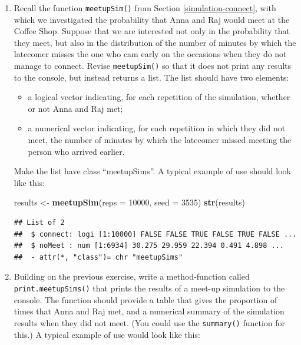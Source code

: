 \documentclass[]{book}
\makeatletter
\newenvironment{Shaded}{\begin{snugshade}}{\end{snugshade}}
\newcommand{\KeywordTok}[1]{\textcolor[rgb]{0.13,0.29,0.53}{\textbf{{#1}}}}
\newcommand{\DataTypeTok}[1]{\textcolor[rgb]{0.13,0.29,0.53}{{#1}}}
\newcommand{\DecValTok}[1]{\textcolor[rgb]{0.00,0.00,0.81}{{#1}}}
\newcommand{\StringTok}[1]{\textcolor[rgb]{0.31,0.60,0.02}{{#1}}}
\newcommand{\NormalTok}[1]{{#1}}
\providecommand{\tightlist}{%
  \setlength{\itemsep}{0pt}\setlength{\parskip}{0pt}}
\newenvironment{kframe}{%
\medskip{}
\setlength{\fboxsep}{.8em}
 \def\at@end@of@kframe{}%
 \ifinner\ifhmode%
  \def\at@end@of@kframe{\end{minipage}}%
  \begin{minipage}{\columnwidth}%
 \fi\fi%
 \def\FrameCommand##1{\hskip\@totalleftmargin \hskip-\fboxsep
 \colorbox{shadecolor}{##1}\hskip-\fboxsep
     \hskip-\linewidth \hskip-\@totalleftmargin \hskip\columnwidth}%
 \MakeFramed {\advance\hsize-\width
   \@totalleftmargin\z@ \linewidth\hsize
   \@setminipage}}%
 {\par\unskip\endMakeFramed%
 \at@end@of@kframe}
\renewenvironment{Shaded}{\begin{kframe}}{\end{kframe}}
\theoremstyle{definition}
\theoremstyle{definition}
\theoremstyle{remark}
\makeatother
\begin{document}
{\begin{enumerate}
  Run a simulation, initializing the ocean with ten whales of each sex.
  Their specific characteristics are up to you, as is the value of the
  starvation parameter. Write an R Markdown document that incorporates
  the appropriate code and includes a discussion of your results.
\item
  Recall the function \texttt{meetupSim()} from Section
  \ref{simulation-connect}, with which we investigated the probability
  that Anna and Raj would meet at the Coffee Shop. Suppose that we are
  interested not only in the probability that they meet, but also in the
  distribution of the number of minutes by which the latecomer misses
  the one who cam early on the occasions when they do not manage to
  connect. Revise \texttt{meetupSim()} so that it does not print any
  results to the console, but instead returns a list. The list should
  have two elements:

  \begin{itemize}
  \tightlist
  \item
    a logical vector indicating, for each repetition of the simulation,
    whether or not Anna and Raj met;
  \item
    a numerical vector indicating, for each repetition in which they did
    not meet, the number of minutes by which the latecomer missed
    meeting the person who arrived earlier.
  \end{itemize}

  Make the list have class ``meetupSims''. A typical example of use
  should look like this:

\begin{Shaded}
\begin{Highlighting}[]
\NormalTok{results <-}\StringTok{ }\KeywordTok{meetupSim}\NormalTok{(}\DataTypeTok{reps =} \DecValTok{10000}\NormalTok{, }\DataTypeTok{seed =} \DecValTok{3535}\NormalTok{)}
\KeywordTok{str}\NormalTok{(results)}
\end{Highlighting}
\end{Shaded}

\begin{verbatim}
## List of 2
##  $ connect: logi [1:10000] FALSE FALSE TRUE FALSE TRUE FALSE ...
##  $ noMeet : num [1:6934] 30.275 29.959 22.394 0.491 4.898 ...
##  - attr(*, "class")= chr "meetupSims"
\end{verbatim}
\item
  Building on the previous exercise, write a method-function called
  \texttt{print.meetupSims()} that prints the results of a meet-up
  simulation to the console. The function should provide a table that
  gives the proportion of times that Anna and Raj met, and a numerical
  summary of the simulation results when they did not meet. (You could
  use the \texttt{summary()} function for this.) A typical example of
  use would look like this:


\end{enumerate}}
\end{document}
